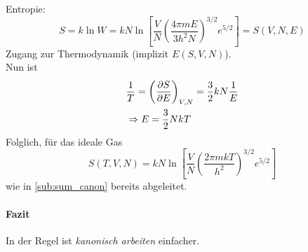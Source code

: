 Entropie:
\begin{equation}
    S = k \ln W = k N \ln \left[ \frac{V}{N} \left( \frac{4 \pi m E}{3 h^2 N} \right)^{3/2} e^{5/2} \right] = S(V, N, E)
\end{equation}
Zugang zur Thermodynamik (implizit $E(S, V, N)$). \\
Nun ist
\begin{equation}
    \begin{split}
        & \frac{1}{T} = \left( \frac{\partial S}{\partial E} \right)_{V, N} = \frac{3}{2} k N \frac{1}{E} \\
        & \Rightarrow E = \frac{3}{2} N k T
    \end{split}
\end{equation}
Folglich, für das ideale Gas
\begin{equation}
    S(T, V, N) = k N \ln \left[ \frac{V}{N} \left( \frac{2 \pi m k T}{h^2} \right)^{3/2} e^{5/2} \right]
\end{equation}
wie in \ref{sub:sum_canon} bereits abgeleitet.
\paragraph{Fazit}
In der Regel ist \emph{kanonisch arbeiten} einfacher.

